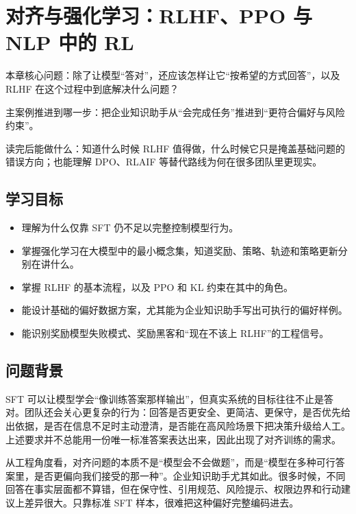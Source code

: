\chapter{对齐与强化学习：RLHF、PPO 与 NLP 中的 RL}

\begin{introduction}
\item {\heiti 本章核心问题}：除了让模型“答对”，还应该怎样让它“按希望的方式回答”，以及 RLHF 在这个过程中到底解决什么问题？
\item {\heiti 主案例推进到哪一步}：把企业知识助手从“会完成任务”推进到“更符合偏好与风险约束”。
\item {\heiti 读完后能做什么}：知道什么时候 RLHF 值得做，什么时候它只是掩盖基础问题的错误方向；也能理解 DPO、RLAIF 等替代路线为何在很多团队里更现实。
\end{introduction}

\section{学习目标}
\begin{itemize}
  \item 理解为什么仅靠 SFT 仍不足以完整控制模型行为。
  \item 掌握强化学习在大模型中的最小概念集，知道奖励、策略、轨迹和策略更新分别在讲什么。
  \item 掌握 RLHF 的基本流程，以及 PPO 和 KL 约束在其中的角色。
  \item 能设计基础的偏好数据方案，尤其能为企业知识助手写出可执行的偏好样例。
  \item 能识别奖励模型失败模式、奖励黑客和“现在不该上 RLHF”的工程信号。
\end{itemize}

\section{问题背景}
SFT 可以让模型学会“像训练答案那样输出”，但真实系统的目标往往不止是答对。团队还会关心更复杂的行为：回答是否更安全、更简洁、更保守，是否优先给出依据，是否在信息不足时主动澄清，是否能在高风险场景下把决策升级给人工。上述要求并不总能用一份唯一标准答案表达出来，因此出现了对齐训练的需求。

从工程角度看，对齐问题的本质不是“模型会不会做题”，而是“模型在多种可行答案里，是否更偏向我们接受的那一种”。企业知识助手尤其如此。很多时候，不同回答在事实层面都不算错，但在保守性、引用规范、风险提示、权限边界和行动建议上差异很大。只靠标准 SFT 样本，很难把这种偏好完整编码进去。

